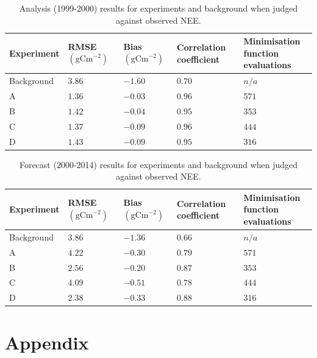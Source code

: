 \documentclass[11pt]{article}
\begin{document}
\begin{table}[ht] 
\begin{center}
	\begin{tabular}{| l | l | l | l | l |}
	\hline
	Experiment & RMSE $( \text{gCm}^{-2})$ & Bias $( \text{gCm}^{-2})$ & Correlation coefficient & \pbox{5cm}{Minimisation function \\ evaluations} \\ \hline
	Background & $3.86$ & $-1.60$ & $0.70$ & $n/a$ \\ \hline
	A & $1.36$ & $-0.03$ & $0.96$ & $571$ \\ \hline
	B & $1.42$ & $-0.04$ & $0.95$ & $353$  \\ \hline
	C & $1.37$ & $-0.09$ & $0.96$ & $444$ \\ \hline
	D & $1.43$ & $-0.09$ & $0.95$ & $316$ \\ 
	\hline
	\end{tabular}
	\caption{Analysis (1999-2000) results for experiments and background when judged against observed NEE.}
	\label{table:exps_tab}
\end{center} 
\end{table}

\begin{table}[ht] 
\begin{center}
	\begin{tabular}{| l | l | l | l | l |}
	\hline
	Experiment & RMSE $( \text{gCm}^{-2})$ & Bias $( \text{gCm}^{-2})$ &  Correlation coefficient & \pbox{6cm}{Minimisation function \\ evaluations} \\ \hline
	Background & $3.86$ & $-1.36$ & $0.66$ & $n/a$ \\ \hline
	A & $4.22$ & $-0.30$ & $0.79$ & $571$ \\ \hline
	B & $2.56$ & $-0.20$ & $0.87$ & $353$  \\ \hline
	C & $4.09$ & $-0.51$ & $0.78$ & $444$ \\ \hline
	D & $2.38$ & $-0.33$ & $0.88$ & $316$ \\ 
	\hline
	\end{tabular}
	\caption{Forecast (2000-2014) results for experiments and background when judged against observed NEE.}
	\label{table:exps_tab}
\end{center} 
\end{table}

\section*{Appendix}
\end{document}
